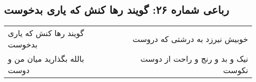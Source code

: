 \begin{center}
\section*{رباعی شماره ۲۶: گویند رها کنش که یاری بدخوست}
\label{sec:026}
\begin{longtable}{l p{0.5cm} r}
گویند رها کنش که یاری بدخوست
&&
خوبیش نیرزد به درشتی که دروست
\\
بالله بگذارید میان من و دوست
&&
نیک و بد و رنج و راحت از دوست نکوست
\\
\end{longtable}
\end{center}

